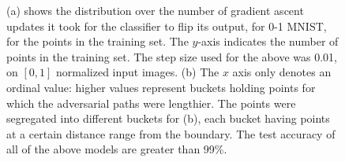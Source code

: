 \documentclass[12pt, oneside]{book}
\begin{document}
    \begin{figure}[!h]
        \centering
        \qquad
         \caption{(a) shows the distribution
        over the number of gradient ascent updates it took for the classifier to
        flip its output, for 0-1 MNIST, for the points in the training set. The
        $y$-axis indicates the number of points in the training set. The step
        size used for the above was 0.01, on $[0, 1]$ normalized input images.
        (b) The $x$ axis only denotes an ordinal value: higher values represent
        buckets holding points for which the adversarial paths were lengthier.
        The points were segregated into different buckets for (b), each bucket
        having points at a certain distance range from the boundary. The test
        accuracy of all of the above models are greater than 99\%.}
        \label{fig:0-1-mnist-pgd-path}
    \end{figure}
\end{document}

